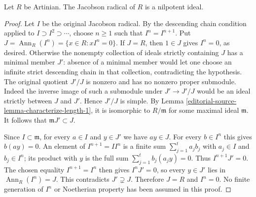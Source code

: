 \begin{lemma}
\label{editorial-source-lemma-artinian-radical-nilpotent}
Let $R$ be Artinian. The Jacobson radical of $R$ is a nilpotent ideal.
\end{lemma}

\begin{proof}
Let $I$ be the original Jacobson radical. By the descending
chain condition applied to $I\supset I^2\supset\cdots$,
choose $n\geq1$ such that $I^n=I^{n+1}$.
Put $J=\operatorname{Ann}_R(I^n)=\{x\in R:xI^n=0\}$.
If $J=R$, then $1\in J$ gives $I^n=0$, as desired.
Otherwise the nonempty collection of ideals strictly containing
$J$ has a minimal member $J'$: absence of a minimal member
would let one choose an infinite strict descending chain in that
collection, contradicting the hypothesis.
The original quotient $J'/J$ is nonzero and has no nonzero
proper submodule. Indeed the inverse image of such a submodule
under $J'\to J'/J$ would be an ideal strictly between $J$ and
$J'$. Hence $J'/J$ is simple.
By Lemma \ref{editorial-source-lemma-characterize-length-1}, it is isomorphic
to $R/\mathfrak m$ for some maximal ideal $\mathfrak m$.
It follows that $\mathfrak mJ'\subset J$.

Since $I\subset\mathfrak m$, for every $a\in I$ and $y\in J'$
we have $ay\in J$. For every $b\in I^n$ this gives
$b(ay)=0$. An element of $I^{n+1}=II^n$ is a finite sum
$\sum_{j=1}^t a_jb_j$ with $a_j\in I$ and $b_j\in I^n$;
its product with $y$ is the full sum
$\sum_{j=1}^t b_j(a_jy)=0$.
Thus $I^{n+1}J'=0$. The chosen equality $I^{n+1}=I^n$
then gives $I^nJ'=0$, so every $y\in J'$ lies in
$\operatorname{Ann}_R(I^n)=J$. This contradicts $J'\supsetneq J$.
Therefore $J=R$ and $I^n=0$. No finite generation of $I^n$
or Noetherian property has been assumed in this proof.
\end{proof}